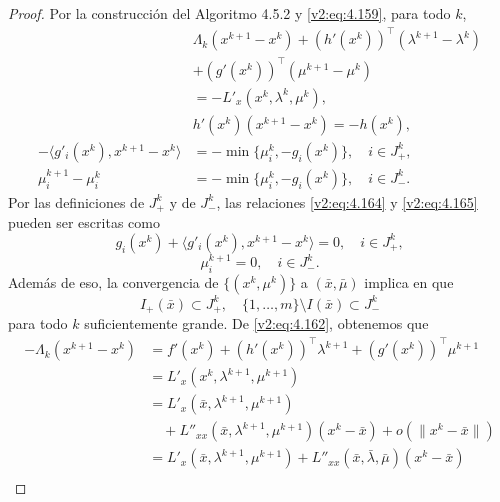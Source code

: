 \begin{proof}
    Por la construcción del Algoritmo 4.5.2 y \eqref{v2:eq:4.159}, para todo $k$,
    \begin{align}
        &\Lambda_k(x^{k+1} - x^k) + (h'(x^k))^\top(\lambda^{k+1} - \lambda^k) \nonumber \\
        &+ (g'(x^k))^\top(\mu^{k+1} - \mu^k) \nonumber \\
        &= -L'_x(x^k, \lambda^k, \mu^k), \label{v2:eq:4.162} \\
        &h'(x^k)(x^{k+1} - x^k) = -h(x^k), \label{v2:eq:4.163} \\
        -\langle g'_i(x^k), x^{k+1} - x^k \rangle &= -\min\{\mu^k_i, -g_i(x^k)\}, \quad i \in J_+^k, \label{v2:eq:4.164} \\
        \mu^{k+1}_i - \mu^k_i &= -\min\{\mu^k_i, -g_i(x^k)\}, \quad i \in J_-^k. \label{v2:eq:4.165}
    \end{align}
    Por las definiciones de $J_+^k$ y de $J_-^k$, las relaciones \eqref{v2:eq:4.164} y \eqref{v2:eq:4.165} pueden ser escritas como
    \begin{equation}
        g_i(x^k) + \langle g'_i(x^k), x^{k+1} - x^k \rangle = 0, \quad i \in J_+^k,
        \label{v2:eq:4.166}
    \end{equation}
    \begin{equation}
        \mu^{k+1}_i = 0, \quad i \in J_-^k.
        \label{v2:eq:4.167}
    \end{equation}
    Además de eso, la convergencia de $\{(x^k, \mu^k)\}$ a $(\bar{x}, \bar{\mu})$ implica en que
    \begin{equation}
        I_+(\bar{x}) \subset J_+^k, \quad \{1, \dots, m\} \setminus I(\bar{x}) \subset J_-^k
        \label{v2:eq:4.168}
    \end{equation}
    para todo $k$ suficientemente grande.
    De \eqref{v2:eq:4.162}, obtenemos que
    \begin{align}
        -\Lambda_k(x^{k+1} - x^k) &= f'(x^k) + (h'(x^k))^\top \lambda^{k+1} + (g'(x^k))^\top \mu^{k+1} \nonumber \\
        &= L'_x(x^k, \lambda^{k+1}, \mu^{k+1}) \nonumber \\
        &= L'_x(\bar{x}, \lambda^{k+1}, \mu^{k+1}) \nonumber \\
        &\quad + L''_{xx}(\bar{x}, \lambda^{k+1}, \mu^{k+1})(x^k - \bar{x}) + o(\|x^k - \bar{x}\|) \nonumber \\
        &= L'_x(\bar{x}, \lambda^{k+1}, \mu^{k+1}) + L''_{xx}(\bar{x}, \bar{\lambda}, \bar{\mu})(x^k - \bar{x}) \nonumber \\

\end{align}
\end{proof}
